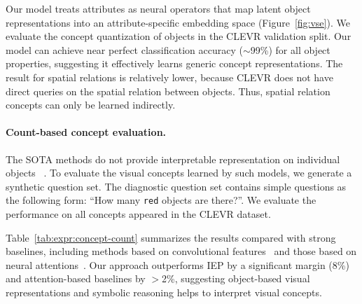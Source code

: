 \documentclass{article} %
\newcommand{\fig}[1]{Figure~\ref{#1}}
\newcommand{\tbl}[1]{Table~\ref{#1}}
\newcommand{\myparagraph}[1]{\vspace{-3pt}\paragraph{#1}}
\begin{document}
Our model treats attributes as neural operators that map latent object representations into an attribute-specific embedding space (\fig{fig:vse}). %
We evaluate the concept quantization of objects in the CLEVR validation split. %
%
Our model can achieve near perfect classification accuracy ($\sim$99\%) for all object properties, suggesting it effectively learns generic concept representations. The result for spatial relations is relatively lower, because CLEVR does not have direct queries on the spatial relation between objects. Thus, spatial relation concepts can only be learned indirectly.

%

\myparagraph{Count-based concept evaluation.}
The SOTA methods do not provide interpretable representation on individual objects~\citep{Johnson2017CLEVR,Hudson2018Compositional,Mascharka2018Transparency} . To evaluate the visual concepts learned by such models, we generate a synthetic question set. The diagnostic question set contains simple questions as the following form: ``How many \texttt{red} objects are there?''. We evaluate the performance on all concepts appeared in the CLEVR dataset.

\tbl{tab:expr:concept-count} summarizes the results compared with strong baselines, including methods based on convolutional features~\citep{Johnson2017Inferring} and those based on neural attentions~\citep{Mascharka2018Transparency,Hudson2018Compositional}.
Our approach outperforms IEP by a significant margin (8\%) and attention-based baselines by $>$2\%, suggesting object-based visual representations and symbolic reasoning helps to interpret visual concepts.
\end{document}
